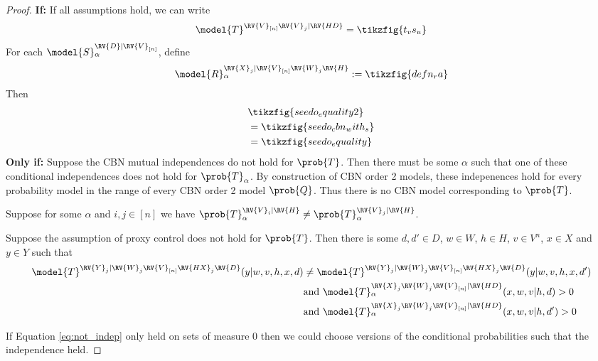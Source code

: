 \begin{proof}
\textbf{If:}
If all assumptions hold, we can write
\begin{align}
    \model{T}^{\RV{V}_{[n]}\RV{V}_j|\RV{HD}} = \tikzfig{t_vs_u}
\end{align}
For each $\model{S}_\alpha^{\RV{D}|\RV{V}_{[n]}}$, define
\begin{align}
    \model{R}_\alpha^{\RV{X}_j|\RV{V}_{[n]}\RV{W}_j\RV{H}}:= \tikzfig{defn_ra}
\end{align}
Then
\begin{align}
    &\tikzfig{seedo_equality2}\\
    &= \tikzfig{seedo_cbn_with_s}\\
    &= \tikzfig{seedo_equality}
\end{align}
\textbf{Only if:}
Suppose the CBN mutual independences do not hold for $\prob{T}$. Then there must be some $\alpha$ such that one of these conditional independences does not hold for $\prob{T}_\alpha$. By construction of CBN order 2 models, these indepenences hold for every probability model in the range of every CBN order 2 model $\prob{Q}$. Thus there is no CBN model corresponding to $\prob{T}$.

Suppose for some $\alpha$ and $i,j\in [n]$ we have $\prob{T}_\alpha^{\RV{V}_i|\RV{H}} \neq \prob{T}_\alpha^{\RV{V}_j|\RV{H}}$. 

Suppose the assumption of proxy control does not hold for $\prob{T}$. Then there is some $d,d'\in D$, $w\in W$, $h\in H$, $v\in V^{n}$, $x\in X$ and $y\in Y$ such that
\begin{align}
    \model{T}^{\RV{Y}_j|\RV{W}_j\RV{V}_{[n]}\RV{HX}_j\RV{D}}(y|w,v,h,x,d) &\neq \model{T}^{\RV{Y}_j|\RV{W}_j\RV{V}_{[n]}\RV{HX}_j\RV{D}}(y|w,v,h,x,d')\label{eq:not_indep}\\
    &\text{and }\model{T}_\alpha^{\RV{X}_j\RV{W}_j\RV{V}_{[n]}|\RV{HD}}(x,w,v|h,d) >0\\
    &\text{and }\model{T}_\alpha^{\RV{X}_j\RV{W}_j\RV{V}_{[n]}|\RV{HD}}(x,w,v|h,d') >0\\
\end{align}

If Equation \ref{eq:not_indep} only held on sets of measure 0 then we could choose versions of the conditional probabilities such that the independence held.


\end{proof}
